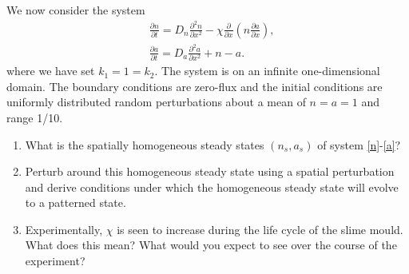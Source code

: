 \documentclass[10pt]{article}
\newcommand{\D}[2]{\frac{\partial #1}{\partial #2}}
\newcommand{\DD}[2]{\frac{\partial^2 #1}{\partial #2^2}}
\renewcommand{\l}{\left(}
\renewcommand{\r}{\right)}
\newcounter{Counter1}
\begin{document}
We now consider the system
\begin{align}
&\D{n}{t}=D_n\DD{n}{x}-\chi\D{}{x}\l n\D{a}{x}\r,\label{n}\\
&\D{a}{t}=D_a\DD{a}{x}+n-a.\label{a}
\end{align}
where we have set $k_1=1=k_2$. The system is on an infinite one-dimensional domain. The boundary conditions are zero-flux and the initial conditions are uniformly distributed random perturbations about a mean of $n=a=1$ and range 1/10.
\begin{enumerate}
\setcounter{enumi}{\value{Counter1}}
\item What is the spatially homogeneous steady states $(n_s,a_s)$ of system \eqref{n}-\eqref{a}?

\item Perturb around this homogeneous steady state using a spatial perturbation and derive conditions under which the homogeneous steady state will evolve to a patterned state.

\item Experimentally, $\chi$ is seen to increase during the life cycle of the slime mould. What does this mean? What would you expect to see over the course of the experiment?
\end{enumerate}

\end{document}

